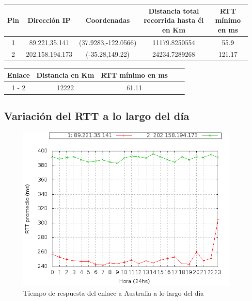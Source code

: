 \noindent \begin{center} \begin{tabular}{| c | c | c | c | c |} \hline 
Pin 	 & 	 Dirección IP 	 & 	 Coordenadas 	 & 	 Distancia total recorrida hasta él en Km 	 & 	 RTT mínimo en ms \\ \hline 
1 	 & 	 89.221.35.141 	 & 	 (37.9283,-122.0566) 	 & 	 11179.8250554 	 & 	 55.9 \\ \hline 
2 	 & 	 202.158.194.173 	 & 	 (-35.28,149.22) 	 & 	 24234.7289268 	 & 	 121.17 \\ \hline 
\end{tabular} \end{center}

\noindent \begin{center} \begin{tabular}{| c | c | c | c | c |} \hline 
Enlace 	 &	Distancia en Km 	& 	RTT mínimo en ms	\\ \hline 
1 - 2	 &	12222	 	 		& 	61.11				\\ \hline 
\end{tabular} \end{center}

\subsection{Variación del RTT a lo largo del día}

\begin{figure}[H]
\begin{center}
\includegraphics[width=17cm]{rttaustralia.png}
\end{center}
\caption{Tiempo de respuesta del enlace a Australia a lo largo del día} \label{figura4}
\end{figure}

